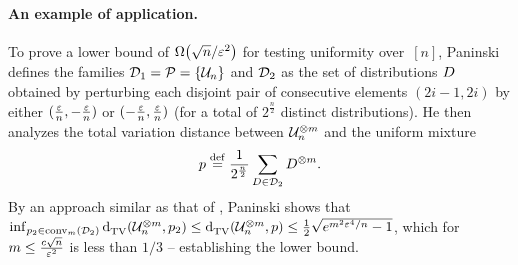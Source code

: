 \documentclass[11pt]{article}
\begin{document}
\paragraph*{An example of application.} To prove a lower bound of $\bigOmega{\sqrt{n}/\eps^2}$ for testing uniformity over~$[n]$, Paninski~\cite{Paninski:08} defines the families $\mathcal{D}_1=\mathcal{P}=\{\mathcal{U}_n\}$ and $\mathcal{D}_2$ as the set of distributions $D$ obtained by perturbing each disjoint pair of consecutive elements $(2i-1,2i)$ by either $(\frac{\varepsilon}{n},-\frac{\varepsilon}{n})$ or $(-\frac{\varepsilon}{n},\frac{\varepsilon}{n})$ (for a total of $2^{\frac{n}{2}}$ distinct distributions). He then analyzes the total variation distance between $\mathcal{U}_n^{\otimes m}$ and the uniform mixture
\[
  p \stackrel{\rm def}{=} \frac{1}{2^{\frac{n}{2}}} \sum_{D\in \mathcal{D}_2} D^{\otimes m}.
\]
By an approach similar as that of \cite[Section 14.4]{Pollard:2003}, Paninski shows that $\inf_{p_2 \in \operatorname{conv}_m(\mathcal{D}_2) } {\operatorname{d}_{\rm TV}^{}\!\left({\mathcal{U}_n^{\otimes m}, p_2}\right)} \leq {\operatorname{d}_{\rm TV}^{}\!\left({\ensuremath{\mathcal{U}}_n^{\otimes m}, p}\right)} \leq \frac{1}{2}\sqrt{e^{m^2\varepsilon^4/n} -1}$, which for $m \leq \frac{c\sqrt{n}}{\varepsilon^2}$ is less than $1/3$ -- establishing the lower bound.
\end{document}
